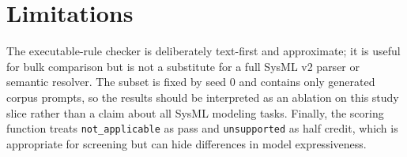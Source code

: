 \documentclass[11pt]{article}
\newcommand{\code}[1]{\texttt{\small #1}}
\newcommand{\sysml}{SysML v2}
\begin{document}
\section{Limitations}

The executable-rule checker is deliberately text-first and approximate; it is
useful for bulk comparison but is not a substitute for a full \sysml{} parser
or semantic resolver. The subset is fixed by seed 0 and contains only generated
corpus prompts, so the results should be interpreted as an ablation on this
study slice rather than a claim about all SysML modeling tasks. Finally, the
scoring function treats \code{not\_applicable} as pass and \code{unsupported}
as half credit, which is appropriate for screening but can hide differences in
model expressiveness.



\end{document}
